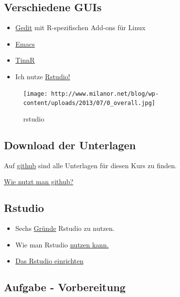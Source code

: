 \documentclass[]{article}
\begin{document}
\subsection{Verschiedene GUIs}\label{verschiedene-guis}

\begin{itemize}
\item
  \href{https://projects.gnome.org/gedit/}{Gedit} mit R-spezifischen
  Add-ons für Linux
\item
  \href{http://www.gnu.org/software/emacs/}{Emacs}
\item
  \href{http://www.sciviews.org/Tinn-R/}{TinnR}
\item
  Ich nutze \href{https://www.rstudio.com/}{Rstudio!}
\end{itemize}

\begin{figure}[htbp]
\centering
\texttt{[image: http://www.milanor.net/blog/wp-content/uploads/2013/07/0\_overall.jpg]}
\caption{rstudio}
\end{figure}

\subsection{Download der Unterlagen}\label{download-der-unterlagen}

Auf \href{github.com/Japhilko/IntroR/}{github} sind alle Unterlagen für
diesen Kurs zu finden.

\href{https://guides.github.com/activities/hello-world/}{Wie nutzt man
github?}

\subsection{Rstudio}\label{rstudio}

\begin{itemize}
\item
  Sechs
  \href{http://www.r-bloggers.com/top-6-reasons-you-need-to-be-using-rstudio/}{Gründe}
  Rstudio zu nutzen.
\item
  Wie man Rstudio
  \href{https://support.rstudio.com/hc/en-us/sections/200107586-Using-RStudio}{nutzen
  kann.}
\item
  \href{https://support.rstudio.com/hc/en-us/articles/200549016-Customizing-RStudio}{Das
  Rstudio einrichten}
\end{itemize}

\subsection{Aufgabe - Vorbereitung}\label{aufgabe---vorbereitung}
\end{document}
